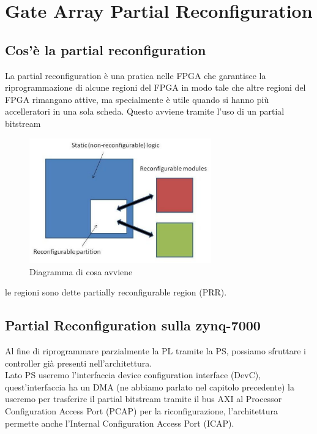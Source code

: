 \chapter{Gate Array Partial Reconfiguration}
\label{cap5}
\section{Cos'è la partial reconfiguration}
La partial reconfiguration è una pratica nelle FPGA che garantisce la riprogrammazione di alcune regioni del FPGA in modo tale che altre regioni del FPGA rimangano attive, ma specialmente è utile quando si hanno più accelleratori in una sola scheda. Questo avviene tramite l'uso di un partial bitstream
\begin{figure}
    \centering
    \includegraphics[width=0.7\textwidth]{images/PR1.png}
    \caption{Diagramma di cosa avviene}
    \label{fig:my_label}
\end{figure}
le regioni sono dette partially reconﬁgurable region (PRR).\\
\section{Partial Reconfiguration sulla zynq-7000}
Al fine di riprogrammare parzialmente la PL tramite la PS, possiamo sfruttare i controller già presenti nell'architettura.\\
Lato PS useremo l'interfaccia device configuration interface (DevC), quest'interfaccia ha un DMA (ne abbiamo parlato nel capitolo precedente) la useremo per trasferire il partial bitstream tramite il bus AXI al Processor Configuration Access Port (PCAP) per la riconfigurazione, l'architettura permette anche l'Internal Configuration Access Port (ICAP).
